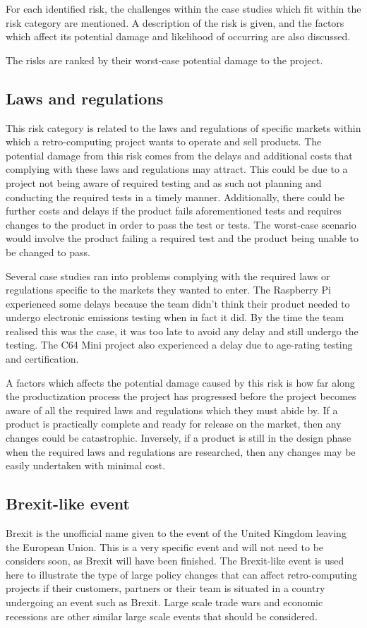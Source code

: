 For each identified risk, the challenges within the case studies which fit within the risk category are mentioned. A description of the risk is given, and the factors which affect its potential damage and likelihood of occurring are also discussed.

The risks are ranked by their worst-case potential damage to the project.

\subsection{Laws and regulations}
This risk category is related to the laws and regulations of specific markets within which a retro-computing project wants to operate and sell products. The potential damage from this risk comes from the delays and additional costs that complying with these laws and regulations may attract. This could be due to a project not being aware of required testing and as such not planning and conducting the required tests in a timely manner. Additionally, there could be further costs and delays if the product fails aforementioned tests and requires changes to the product in order to pass the test or tests. The worst-case scenario would involve the product failing a required test and the product being unable to be changed to pass. 

Several case studies ran into problems complying with the required laws or regulations specific to the markets they wanted to enter. The Raspberry Pi experienced some delays because the team didn't think their product needed to undergo electronic emissions testing when in fact it did. By the time the team realised this was the case, it was too late to avoid any delay and still undergo the testing. The C64 Mini project also experienced a delay due to age-rating testing and certification.  

A factors which affects the potential damage caused by this risk is how far along the productization process the project has progressed before the project becomes aware of all the required laws and regulations which they must abide by. If a product is practically complete and ready for release on the market, then any changes could be catastrophic. Inversely, if a product is still in the design phase when the required laws and regulations are researched, then any changes may be easily undertaken with minimal cost.


\subsection{Brexit-like event}
Brexit is the unofficial name given to the event of the United Kingdom leaving the European Union. This is a very specific event and will not need to be considers soon, as Brexit will have been finished. The Brexit-like event is used here to illustrate the type of large policy changes that can affect retro-computing projects if their customers, partners or their team is situated in a country undergoing an event such as Brexit. Large scale trade wars and economic recessions are other similar large scale events that should be considered. 


